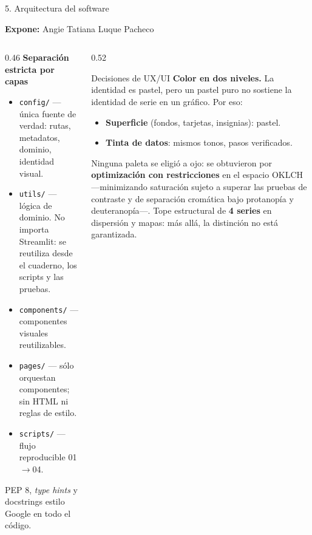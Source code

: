 \documentclass[aspectratio=169,11pt]{beamer}
\newcommand{\ponente}[1]{%
  \begin{flushright}\tiny\textcolor{pnBrandDark}{\textbf{Expone:} #1}\end{flushright}%
  \vspace{-0.9em}%
}
\begin{document}
\begin{frame}{5. Arquitectura del software}
  \ponente{Angie Tatiana Luque Pacheco}
  \scriptsize
  \begin{columns}[T]
    \begin{column}{0.46\textwidth}
      \textbf{Separación estricta por capas}
      \begin{itemize}\itemsep0.25em
        \item \texttt{config/} — única fuente de verdad: rutas, metadatos, dominio, identidad visual.
        \item \texttt{utils/} — lógica de dominio. \alert{No importa Streamlit}: se reutiliza desde el
              cuaderno, los scripts y las pruebas.
        \item \texttt{components/} — componentes visuales reutilizables.
        \item \texttt{pages/} — sólo orquestan componentes; sin HTML ni reglas de estilo.
        \item \texttt{scripts/} — flujo reproducible 01$\rightarrow$04.
      \end{itemize}
      \vspace{0.4em}
      PEP 8, \emph{type hints} y docstrings estilo Google en todo el código.
    \end{column}
    \begin{column}{0.52\textwidth}
      \begin{block}{Decisiones de UX/UI}
        \scriptsize
        \textbf{Color en dos niveles.} La identidad es pastel, pero un pastel puro no sostiene la
        identidad de serie en un gráfico. Por eso:
        \begin{itemize}\itemsep0.1em
          \item \textbf{Superficie} (fondos, tarjetas, insignias): pastel.
          \item \textbf{Tinta de datos}: mismos tonos, pasos verificados.
        \end{itemize}
        \vspace{0.3em}
        Ninguna paleta se eligió a ojo: se obtuvieron por \textbf{optimización con restricciones} en el
        espacio OKLCH —minimizando saturación sujeto a superar las pruebas de contraste y de
        separación cromática bajo protanopía y deuteranopía—.
        \vspace{0.25em}
        Tope estructural de \textbf{4 series} en dispersión y mapas: más allá, la distinción no está
        garantizada.
      \end{block}
    \end{column}
  \end{columns}
\end{frame}
\end{document}
